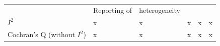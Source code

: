 \documentclass[]{article}
\begin{document}
\begin{longtable}[]{@{}llllll@{}}
\begin{minipage}[t]{0.10\columnwidth}
\strut
\end{minipage} & \begin{minipage}[t]{0.17\columnwidth}\raggedright
Reporting of\strut
\end{minipage} & \begin{minipage}[t]{0.16\columnwidth}\raggedright
heterogeneity\strut
\end{minipage} & \begin{minipage}[t]{0.10\columnwidth}\raggedright
\strut
\end{minipage} & \begin{minipage}[t]{0.15\columnwidth}\raggedright
\strut
\end{minipage}\tabularnewline
\begin{minipage}[t]{0.16\columnwidth}\raggedright
\(I^2\)\strut
\end{minipage} & \begin{minipage}[t]{0.10\columnwidth}\raggedright
x\strut
\end{minipage} & \begin{minipage}[t]{0.17\columnwidth}\raggedright
x\strut
\end{minipage} & \begin{minipage}[t]{0.16\columnwidth}\raggedright
x\strut
\end{minipage} & \begin{minipage}[t]{0.10\columnwidth}\raggedright
x\strut
\end{minipage} & \begin{minipage}[t]{0.15\columnwidth}\raggedright
x\strut
\end{minipage}\tabularnewline
\begin{minipage}[t]{0.16\columnwidth}\raggedright
Cochran's Q (without \(I^2\))\strut
\end{minipage} & \begin{minipage}[t]{0.10\columnwidth}\raggedright
x\strut
\end{minipage} & \begin{minipage}[t]{0.17\columnwidth}\raggedright
x\strut
\end{minipage} & \begin{minipage}[t]{0.16\columnwidth}\raggedright
x\strut
\end{minipage} & \begin{minipage}[t]{0.10\columnwidth}\raggedright
x\strut
\end{minipage} & \begin{minipage}[t]{0.15\columnwidth}\raggedright
x\strut
\end{minipage}\tabularnewline

\end{longtable}
\end{document}
